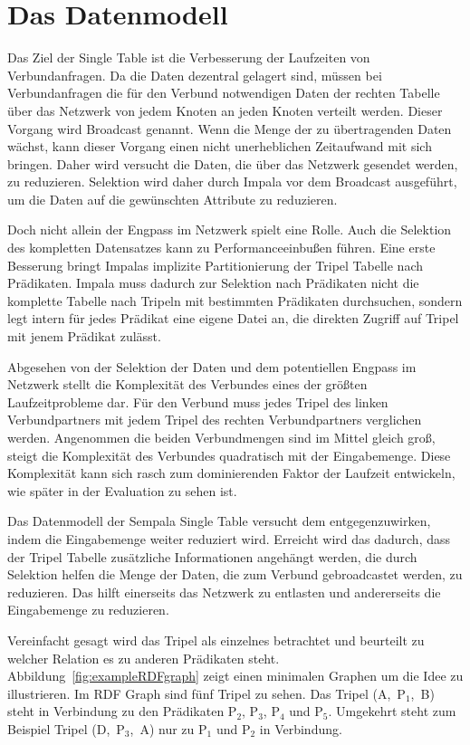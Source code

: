 \documentclass[
  a4paper,
  12pt,
  oneside,
  parskip=half,
  headsepline,
]{scrartcl}
\begin{document}
\clearpage
\section{Das Datenmodell}
\label{sec:model}

Das Ziel der Single Table ist die Verbesserung der Laufzeiten von
Verbundanfragen. Da die Daten dezentral gelagert sind, müssen bei
Verbundanfragen die für den Verbund notwendigen Daten der rechten Tabelle
über das Netzwerk von jedem Knoten an jeden Knoten verteilt werden. Dieser
Vorgang wird Broadcast genannt. Wenn die Menge der zu übertragenden Daten
wächst, kann dieser Vorgang einen nicht unerheblichen Zeitaufwand mit sich
bringen. Daher wird versucht die Daten, die über das Netzwerk gesendet werden,
zu reduzieren. Selektion wird daher durch Impala vor dem Broadcast ausgeführt,
um die Daten auf die gewünschten Attribute zu reduzieren.

Doch nicht allein der Engpass im Netzwerk spielt eine Rolle. Auch die Selektion
des kompletten Datensatzes kann zu Performanceeinbußen führen. Eine erste
Besserung bringt Impalas implizite Partitionierung der Tripel Tabelle nach
Prädikaten. Impala muss dadurch zur Selektion nach Prädikaten nicht die
komplette Tabelle nach Tripeln mit bestimmten Prädikaten durchsuchen, sondern
legt intern für jedes Prädikat eine eigene Datei an, die direkten Zugriff auf
Tripel mit jenem Prädikat zulässt.

Abgesehen von der Selektion der Daten und dem potentiellen Engpass im Netzwerk
stellt die Komplexität des Verbundes eines der größten Laufzeitprobleme dar. Für
den Verbund muss jedes Tripel des linken Verbundpartners mit jedem Tripel des
rechten Verbundpartners verglichen werden. Angenommen die beiden Verbundmengen
sind im Mittel gleich groß, steigt die Komplexität des Verbundes quadratisch mit
der Eingabemenge. Diese Komplexität kann sich rasch zum dominierenden Faktor der
Laufzeit entwickeln, wie später in der Evaluation zu sehen ist.

Das Datenmodell der Sempala Single Table versucht dem entgegenzuwirken, indem
die Eingabemenge weiter reduziert wird. Erreicht wird das dadurch, dass der
Tripel Tabelle zusätzliche Informationen angehängt werden, die durch Selektion
helfen die Menge der Daten, die zum Verbund gebroadcastet werden, zu reduzieren.
Das hilft einerseits das Netzwerk zu entlasten und andererseits die Eingabemenge
zu reduzieren.

Vereinfacht gesagt wird das Tripel als einzelnes betrachtet und beurteilt zu
welcher Relation es zu anderen Prädikaten steht.
Abbildung~\ref{fig:exampleRDFgraph} zeigt einen minimalen Graphen um die Idee 
zu illustrieren. Im RDF Graph sind fünf Tripel zu sehen. Das Tripel (A,~P$_1$,~B)
steht in Verbindung zu den Prädikaten P$_2$, P$_3$, P$_4$ und P$_5$. Umgekehrt
steht zum Beispiel Tripel (D,~P$_3$,~A) nur zu P$_1$ und P$_2$ in Verbindung.
\end{document}
